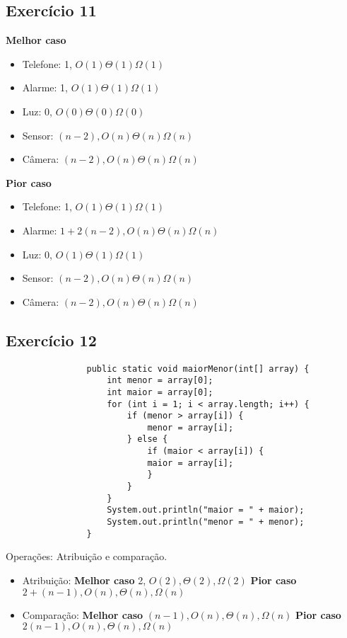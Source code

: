 \documentclass[12pt]{article}
\begin{document}
        \subsection{Exercício 11}
            \textbf{Melhor caso}
            \begin{itemize}
                \item Telefone: 1, $O(1) \Theta(1) \Omega(1)$
                \item Alarme: 1, $O(1) \Theta(1) \Omega(1)$
                \item Luz: 0, $O(0) \Theta(0) \Omega(0)$
                \item Sensor:  $(n-2), O(n) \Theta(n) \Omega(n)$
                \item Câmera:  $(n-2), O(n) \Theta(n) \Omega(n)$
            \end{itemize}  
            \textbf{Pior caso}
            \begin{itemize}
                \item Telefone: 1, $O(1) \Theta(1) \Omega(1)$
                \item Alarme: $1+2(n-2), O(n) \Theta(n) \Omega(n)$
                \item Luz: 0, $O(1) \Theta(1) \Omega(1)$
                \item Sensor:  $(n-2), O(n) \Theta(n) \Omega(n)$
                \item Câmera:  $(n-2), O(n) \Theta(n) \Omega(n)$
            \end{itemize}      
        \subsection{Exercício 12}
            \begin{lstlisting}
                public static void maiorMenor(int[] array) {
                    int menor = array[0];
                    int maior = array[0];
                    for (int i = 1; i < array.length; i++) {
                        if (menor > array[i]) {
                            menor = array[i];
                        } else {
                            if (maior < array[i]) {
                            maior = array[i];
                            }
                        } 
                    }
                    System.out.println("maior = " + maior);
                    System.out.println("menor = " + menor);
                }
            \end{lstlisting}
            Operações: Atribuição e comparação.
            \begin{itemize}
                \item Atribuição:
                \textbf{Melhor caso}
                 2, $O(2), \Theta(2), \Omega(2)$   
                \textbf{Pior caso}
                $2+(n-1), O(n), \Theta(n), \Omega(n)$   
                \item Comparação:
                \textbf{Melhor caso}
                 $(n-1), O(n), \Theta(n), \Omega(n)$   
                \textbf{Pior caso}
                $2(n-1), O(n), \Theta(n), \Omega(n)$   
                
            \end{itemize}
\end{document}
